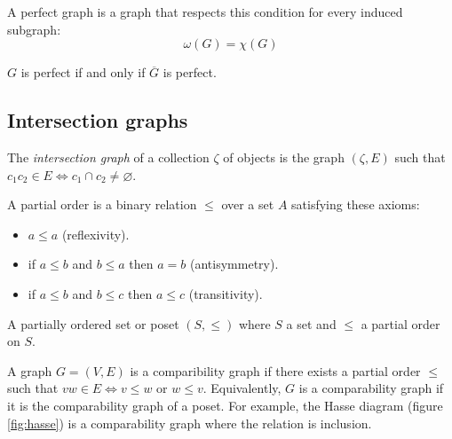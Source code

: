 \begin{defn}
  A perfect graph is a graph that respects this condition for every induced subgraph:
  $$ \omega(G) = \chi(G)$$
\end{defn}

\begin{theorem}[Lovasz]
  $G$ is perfect if and only if $\overline{G}$ is perfect.
\end{theorem}

\subsection{Intersection graphs}

\begin{defn}
The \textit{intersection graph} of a collection $\zeta$ of objects is the graph
$(\zeta,E)$ such that $c_1c_2\in E \Leftrightarrow c_1 \cap c_2 \neq \varnothing$.
\end{defn}


\begin{defn}
  A partial order is a binary relation $\leq$ over a set $A$ satisfying these axioms:
  \begin{itemize}
    \item $a \leq a$ (reflexivity).
    \item if $a \leq b$ and $b \leq a$ then $a = b$ (antisymmetry).
    \item if $a \leq b$ and $b \leq c$ then $a \leq c$ (transitivity).
  \end{itemize}
\end{defn}

\begin{defn}
   A partially ordered set or poset  $(S,\leq)$ where $S$ a set and $\leq$ a partial
   order on $S$.
\end{defn}

\begin{defn}
  A graph $G = (V,E)$ is a comparibility graph if there exists a partial order
  $\leq$ such that $vw \in E \Leftrightarrow v \leq w$ or $w \leq v$.
  Equivalently, $G$ is a comparability graph if it is the comparability graph of
  a poset. For example, the Hasse diagram (figure \ref{fig:hasse}) is a
  comparability graph where the relation is inclusion.
\end{defn}

